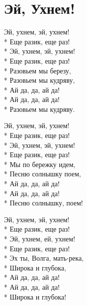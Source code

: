 \vspace{\fill}\newpage

\section{Эй, Ухнем!}
\label{song:Эй,_Ухнем!}

\medskip

\begin{minipage}{\linewidth}
Эй, ухнем, эй, ухнем!\\*
Еще разик, еще раз!\\*
Эй, ухнем, эй, ухнем! \\*
Еще разик, еще раз!\\*
Разовьем мы березу,\\*
Разовьем мы кудряву,\\*
Ай да, да, ай да!\\*
Ай да, да, ай да!\\*
Разовьем мы кудряву.\\
\end{minipage}\par\medskip\nobreak

\medskip

\begin{minipage}{\linewidth}
Эй, ухнем, эй, ухнем!\\*
Еще разик, еще раз!\\*
Эй, ухнем, эй, ухнем!\\*
Еще разик, еще раз!\\*
Мы по бережку идем,\\*
Песню солнышку поем,\\*
Ай да, да, ай да!\\*
Ай да, да, ай да!\\*
Песню солнышку, поем!\\
\end{minipage}\par\medskip\nobreak

\medskip

\begin{minipage}{\linewidth}
Эй, ухнем, эй, ухнем!\\*
Еще разик, еще раз!\\*
Эй, ухнем, ей, ухнем!\\*
Еще разик, еще раз!\\*
Эх ты, Волга, мать-река,\\*
Широка и глубока,\\*
Ай да, да, ай да!\\*
Ай да, да, ай да!\\*
Широка и глубока!\\
\end{minipage}\par\medskip\nobreak


